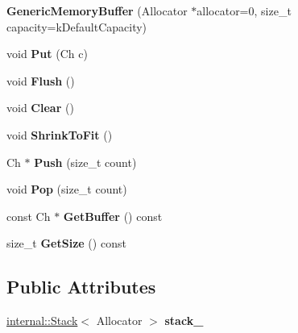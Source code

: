 \begin{DoxyCompactItemize}
{\bfseries Generic\+Memory\+Buffer} (Allocator $\ast$allocator=0, size\+\_\+t capacity=k\+Default\+Capacity)
\item 
\mbox{\label{structGenericMemoryBuffer_a9dfb477983e211893601f8ab637b42d8}} 
void {\bfseries Put} (Ch c)
\item 
\mbox{\label{structGenericMemoryBuffer_a9861181cab6f5bec2ec08b601aa53575}} 
void {\bfseries Flush} ()
\item 
\mbox{\label{structGenericMemoryBuffer_a036cbe2556778e1edc525602a9821df2}} 
void {\bfseries Clear} ()
\item 
\mbox{\label{structGenericMemoryBuffer_a3b87deb9bf34c394c8fb262ab53c0c4b}} 
void {\bfseries Shrink\+To\+Fit} ()
\item 
\mbox{\label{structGenericMemoryBuffer_a56f7b14d2940b682fe592f598d6792ec}} 
Ch $\ast$ {\bfseries Push} (size\+\_\+t count)
\item 
\mbox{\label{structGenericMemoryBuffer_a82a6706286f1356e1769282f5d496005}} 
void {\bfseries Pop} (size\+\_\+t count)
\item 
\mbox{\label{structGenericMemoryBuffer_a8d7be8b1d64285b787571541a7c4bb37}} 
const Ch $\ast$ {\bfseries Get\+Buffer} () const
\item 
\mbox{\label{structGenericMemoryBuffer_aaab1f18d03109ab01213d3e3d8368ff9}} 
size\+\_\+t {\bfseries Get\+Size} () const
\end{DoxyCompactItemize}
\subsection*{Public Attributes}
\begin{DoxyCompactItemize}
\item 
\mbox{\label{structGenericMemoryBuffer_a995607fda24cd06214b9f1bce68f36ab}} 
\hyperlink{classinternal_1_1Stack}{internal\+::\+Stack}$<$ Allocator $>$ {\bfseries stack\+\_\+}
\end{DoxyCompactItemize}
